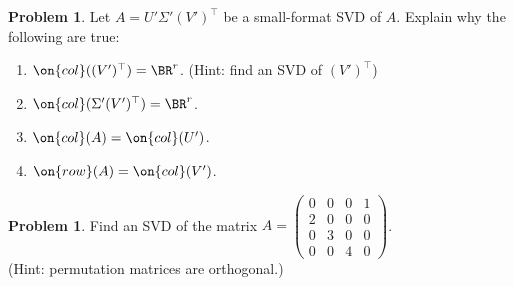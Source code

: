 \documentclass[10pt]{amsart}
\theoremstyle{mythm}
\theoremstyle{definition}
\newtheorem{prob}[thm]{Problem}
\theoremstyle{myrmk}
\begin{document}
	\begin{prob}
		Let $A = U' \Sigma' (V')^{\top}$ be a small-format SVD of $A$. Explain why the following are true: 
		\begin{enumerate}
			\item $\on{col}((V')^{\top}) = \BR^r$. (Hint: find an SVD of $(V')^{\top}$)
			\item $\on{col}(\Sigma' (V')^{\top}) = \BR^r$. 
			\item $\on{col}(A) = \on{col}(U')$. 
			\item $\on{row}(A) = \on{col}(V')$. 
		\end{enumerate}
	\end{prob}
	
	\begin{prob}
		Find an SVD of the matrix $A = \begin{pmatrix}
			0 & 0 & 0 & 1 \\ 2 & 0 & 0 & 0 \\ 0 & 3 & 0 & 0 \\ 0 & 0 & 4 & 0
		\end{pmatrix}$. \\ (Hint: permutation matrices are orthogonal.) 
	\end{prob}
	
	\newpage
	
\end{document}
